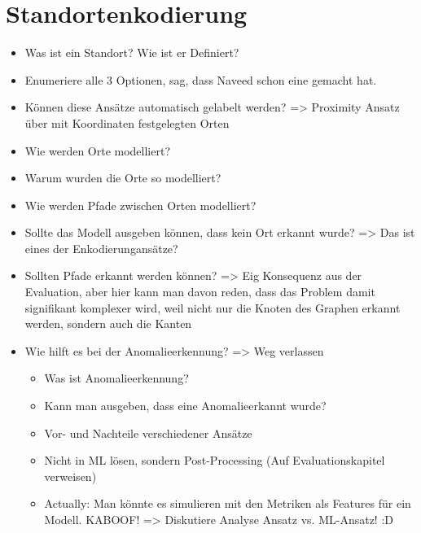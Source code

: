 \section{Standortenkodierung}
\begin{itemize}
    \item Was ist ein Standort? Wie ist er Definiert?
    \item Enumeriere alle 3 Optionen, sag, dass Naveed schon eine gemacht hat.
    \item Können diese Ansätze automatisch gelabelt werden? => Proximity Ansatz über mit Koordinaten festgelegten Orten
    \item Wie werden Orte modelliert?
    \item Warum wurden die Orte so modelliert?
    \item Wie werden Pfade zwischen Orten modelliert?
    \item Sollte das Modell ausgeben können, dass kein Ort erkannt wurde? => Das ist eines der Enkodierungansätze?
    \item Sollten Pfade erkannt werden können? => Eig Konsequenz aus der Evaluation, aber hier kann man davon reden, dass das Problem damit signifikant komplexer wird,
          weil nicht nur die Knoten des Graphen erkannt werden, sondern auch die Kanten
    \item Wie hilft es bei der Anomalieerkennung? => Weg verlassen
    \begin{itemize}
        \item Was ist Anomalieerkennung?
        \item Kann man ausgeben, dass eine Anomalieerkannt wurde?
        \item Vor- und Nachteile verschiedener Ansätze
        \item Nicht in ML lösen, sondern Post-Processing (Auf Evaluationskapitel verweisen)
        \item Actually: Man könnte es simulieren mit den Metriken als Features für ein Modell. KABOOF!  => Diskutiere Analyse Ansatz vs. ML-Ansatz! :D
    \end{itemize}
\end{itemize}


